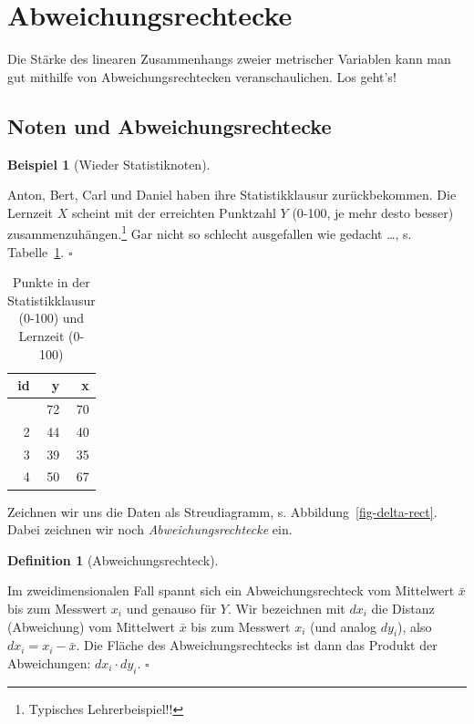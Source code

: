 \documentclass[
  letterpaper,
]{scrbook}
\theoremstyle{definition}
\theoremstyle{definition}
\newtheorem{example}{Beispiel}[chapter]
\theoremstyle{definition}
\newtheorem{definition}{Definition}[chapter]
\theoremstyle{remark}
\begin{document}
\section{Abweichungsrechtecke}\label{sec-cov}

Die Stärke des linearen Zusammenhangs zweier metrischer Variablen kann
man gut mithilfe von Abweichungsrechtecken veranschaulichen. Los geht's!

\subsection{Noten und
Abweichungsrechtecke}\label{noten-und-abweichungsrechtecke}

\begin{example}[Wieder
Statistiknoten]\protect\hypertarget{exm-noten2}{}\label{exm-noten2}

Anton, Bert, Carl und Daniel haben ihre Statistikklausur zurückbekommen.
Die Lernzeit \(X\) scheint mit der erreichten Punktzahl \(Y\) (0-100, je
mehr desto besser) zusammenzuhängen.\footnote{ Typisches
  Lehrerbeispiel!!} Gar nicht so schlecht ausgefallen wie gedacht
\ldots, s. Tabelle~\ref{tbl-noten2}. \(\square\)

\end{example}

\begin{longtable}[]{@{}rrr@{}}

\caption{\label{tbl-noten2}Punkte in der Statistikklausur (0-100) und
Lernzeit (0-100)}

\tabularnewline

\toprule\noalign{}
id & y & x \\
\midrule\noalign{}
\endhead
\bottomrule\noalign{}
\endlastfoot
1 & 72 & 70 \\
2 & 44 & 40 \\
3 & 39 & 35 \\
4 & 50 & 67 \\

\end{longtable}

Zeichnen wir uns die Daten als Streudiagramm, s.
Abbildung~\ref{fig-delta-rect}. Dabei zeichnen wir noch
\emph{Abweichungsrechtecke} ein.

\begin{definition}[Abweichungsrechteck]\protect\hypertarget{def-abweichungsrechteck}{}\label{def-abweichungsrechteck}

Im zweidimensionalen Fall spannt sich ein Abweichungsrechteck vom
Mittelwert \(\bar{x}\) bis zum Messwert \(x_i\) und genauso für \(Y\).
Wir bezeichnen mit \(dx_i\) die Distanz (Abweichung) vom Mittelwert
\(\bar{x}\) bis zum Messwert \(x_i\) (und analog \(dy_i\)), also
\(dx_i = x_i - \bar{x}\). Die Fläche des Abweichungsrechtecks ist dann
das Produkt der Abweichungen: \(dx_i \cdot dy_i\). \(\square\)

\end{definition}
\end{document}
